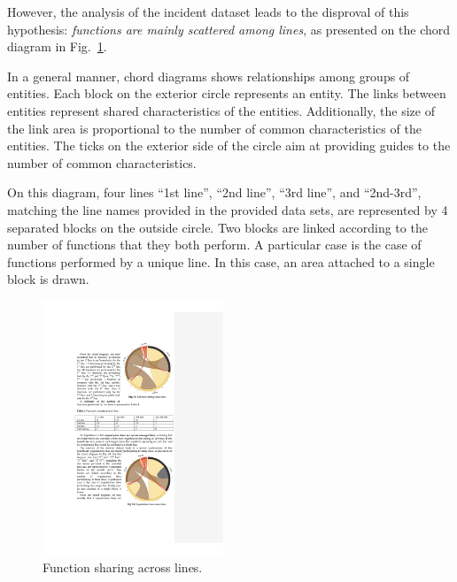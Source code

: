 \documentclass[lnbip]{svmultln}
\begin{document}
However, the analysis of the incident dataset leads to the disproval of this hypothesis: \emph{functions are mainly scattered among lines}, as presented on the chord diagram in Fig.~\ref{fig:functionsLines:chord}. 

In a general manner, chord diagrams shows relationships among groups of entities. Each block on the exterior circle represents an entity. The links between entities represent shared characteristics of the entities. Additionally, the size of the link area is proportional to the number of common characteristics of the entities. The ticks on the exterior side of the circle aim at providing guides to the number of common characteristics.

On this diagram, four lines ``1st line'', ``2nd line'', ``3rd line'', and ``2nd-3rd'', matching the line names provided in the provided data sets, are represented by 4 separated blocks on the outside circle. Two blocks are linked according to the number of functions that they both perform. A particular case is the case of functions performed by a unique line. In this case, an area attached to a single block is drawn.

\begin{figure}
	\vspace{-20pt}
  \begin{center}
    \includegraphics[width=0.48\textwidth]{"figs/pic 15"}
  \end{center}
	\vspace{-10pt}
  \caption{Function sharing across lines.}
  \label{fig:functionsLines:chord}
	\vspace{-10pt}
\end{figure}
\end{document}

